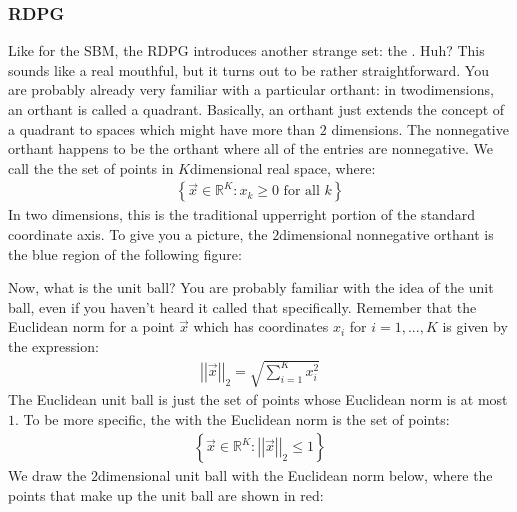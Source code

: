 \documentclass[letterpaper,10pt,english]{jupyterBook}
\begin{document}
\subsubsection{ RDPG}
\label{\detokenize{representations/ch5/single-network-models_theory:a-posteriori-rdpg}}
\sphinxAtStartPar
Like for the  SBM, the  RDPG introduces another strange set: the . Huh? This sounds like a real mouthful, but it turns out to be rather straightforward. You are probably already very familiar with a particular orthant: in two\sphinxhyphen{}dimensions, an orthant is called a quadrant. Basically, an orthant just extends the concept of a quadrant to spaces which might have more than \(2\) dimensions. The non\sphinxhyphen{}negative orthant happens to be the orthant where all of the entries are non\sphinxhyphen{}negative. We call the  the set of points in \(K\)\sphinxhyphen{}dimensional real space, where:
\begin{align*}
    \left\{\vec x \in \mathbb R^K : x_k \geq 0\text{ for all $k$}\right\}
\end{align*}
\sphinxAtStartPar
In two dimensions, this is the traditional upper\sphinxhyphen{}right portion of the standard coordinate axis. To give you a picture, the \(2\)\sphinxhyphen{}dimensional non\sphinxhyphen{}negative orthant is the blue region of the following figure:

\noindent{}

\sphinxAtStartPar
Now, what is the unit ball? You are probably familiar with the idea of the unit ball, even if you haven’t heard it called that specifically. Remember that the Euclidean norm for a point \(\vec x\) which has coordinates \(x_i\) for \(i=1,...,K\) is given by the expression:
\begin{align*}
    \left|\left|\vec x\right|\right|_2 = \sqrt{\sum_{i = 1}^K x_i^2}
\end{align*}
\sphinxAtStartPar
The Euclidean unit ball is just the set of points whose Euclidean norm is at most \(1\). To be more specific, the  with the Euclidean norm is the set of points:
\begin{align*}
    \left\{\vec x \in \mathbb R^K :\left|\left|\vec x\right|\right|_2 \leq 1\right\}
\end{align*}
\sphinxAtStartPar
We draw the \(2\)\sphinxhyphen{}dimensional unit ball with the Euclidean norm below, where the points that make up the unit ball are shown in red:
\end{document}
